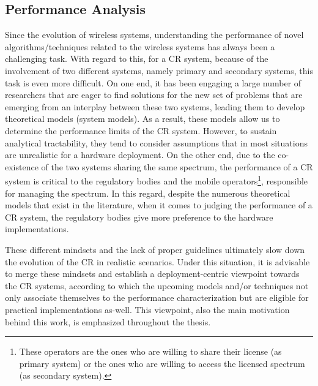 \subsection{Performance Analysis}
Since the evolution of wireless systems, understanding the performance of novel algorithms/techniques related to the wireless systems has always been a challenging task. With regard to this, for a CR system, because of the involvement of two different systems, namely primary and secondary systems, this task is even more difficult. On one end, it has been engaging a large number of researchers that are eager to find solutions for the new set of problems that are emerging from an interplay between these two systems, leading them to develop theoretical models (system models). As a result, these models allow us to determine the performance limits of the CR system. However, to sustain analytical tractability, they tend to consider assumptions that in most situations are unrealistic for a hardware deployment.  %
 On the other end, due to the co-existence of the two systems sharing the same spectrum, the performance of a CR system is critical to the regulatory bodies and the mobile operators\footnote{These operators are the ones who are willing to share their license (as primary system) or the ones who are willing to access the licensed spectrum (as secondary system).}, responsible for managing the spectrum. In this regard, despite the numerous theoretical models that exist in the literature, when it comes to judging the performance of a CR system, the regulatory bodies give more preference to the hardware implementations. 

These different mindsets and the lack of proper guidelines ultimately slow down the evolution of the CR in realistic scenarios. Under this situation, it is advisable to merge these mindsets and establish a deployment-centric viewpoint towards the CR systems, according to which the upcoming models and/or techniques not only associate themselves to the performance characterization but are eligible for practical implementations as-well. This viewpoint, also the main motivation behind this work, is emphasized throughout the thesis. 

